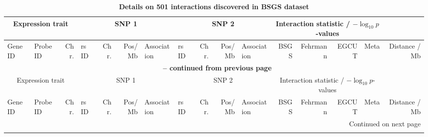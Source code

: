 \documentclass{article}
\begin{document}
\begin{landscape}

{\tiny

\begin{ThreePartTable}
\begin{longtable}{|llr|lrrl|lrrl|rrrr|r|}

\caption{\textbf{Details on 501 interactions discovered in BSGS dataset}}  \label{tab:results} \\

\hline
\multicolumn{3}{|c|}{Expression trait} & 
\multicolumn{4}{|c|}{SNP 1} & 
\multicolumn{4}{|c|}{SNP 2} & 
\multicolumn{4}{|c|}{Interaction statistic / $-\log_{10}p$-values} & \\
\hline
Gene ID\tnote{a} & 
Probe ID\tnote{b} & 
Chr. & 
rs ID & 
Chr. & 
Pos/Mb\tnote{c} & 
Association\tnote{d} & 
rs ID & 
Chr. & 
Pos/Mb\tnote{c} & 
Association\tnote{d} & 
BSGS\tnote{e} & 
Fehrmann\tnote{f} & 
EGCUT\tnote{f} & 
Meta\tnote{g} & 
Distance / Mb\tnote{h} \\
\hline
\endfirsthead


\multicolumn{16}{c}{{\bfseries \tablename\ \thetable{} -- continued from previous page}} \\
\hline
\multicolumn{3}{|c|}{Expression trait} & 
\multicolumn{4}{|c|}{SNP 1} & 
\multicolumn{4}{|c|}{SNP 2} & 
\multicolumn{4}{|c|}{Interaction statistic / $-\log_{10}p$-values} & \\
\hline
Gene ID\tnote{a} & 
Probe ID\tnote{b} & 
Chr. & 
rs ID & 
Chr. & 
Pos/Mb\tnote{c} & 
Association\tnote{d} & 
rs ID & 
Chr. & 
Pos/Mb\tnote{c} & 
Association\tnote{d} & 
BSGS\tnote{e} & 
Fehrmann\tnote{f} & 
EGCUT\tnote{f} & 
Meta\tnote{g} & 
Distance / Mb\tnote{h} \\
\hline
\endhead

\hline
\multicolumn{16}{r}{{Continued on next page}} \\
\endfoot

\hline \hline
\endlastfoot



\end{longtable}
\end{ThreePartTable}}
\end{landscape}
\end{document}
